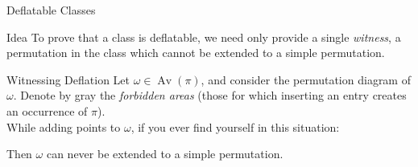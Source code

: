 \documentclass[xcolor=table,dvipsnames]{beamer}
\DeclareMathOperator{\Av}{Av}
\begin{document}
\begin{frame}{Deflatable Classes}
  \pause
  \begin{block}{Idea}
    To prove that a class is deflatable, we need only provide a single 
    \emph{witness}, a permutation in the class which cannot be extended to a 
    simple permutation. 
  \end{block}
\end{frame}


\begin{frame}{Witnessing Deflation}
  Let $\omega \in \Av(\pi)$, and consider the permutation diagram of $\omega$. 
  Denote by gray the \emph{forbidden areas} (those for which inserting an entry 
  creates an occurrence of $\pi$).  \\
  While adding points to $\omega$, if you ever find yourself in this situation:
  \begin{center}
  \end{center}

  Then $\omega$ can never be extended to a simple permutation.
\end{frame}
\end{document}
